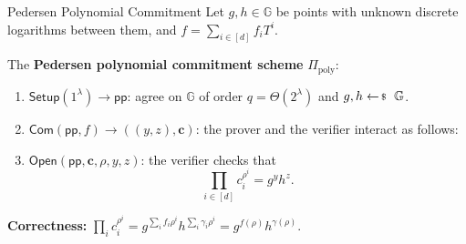 \documentclass{zkdl-presentation-template}
\begin{document}
    \begin{frame}{Pedersen Polynomial Commitment}
        \footnotesize
        Let $g, h \in \mathbb{G}$ be points with unknown discrete logarithms between them, and $f = \sum_{i \in [d]} f_i T^i$.

        \begin{definition}
            The \textbf{Pedersen polynomial commitment scheme} $\Pi_{\text{poly}}$:
            \begin{enumerate}
                \item $\mathsf{Setup}(1^{\lambda}) \to \mathsf{pp}$: agree on $\mathbb{G}$ of order $q = \Theta(2^{\lambda})$ and $g, h \leftarrowS \mathbb{G}$.\pause
                \item $\mathsf{Com}(\mathsf{pp}, f) \to ((y, z), \mathbf{c})$: the prover and the verifier interact as follows:
                \pause
                \item $\mathsf{Open}(\mathsf{pp}, \mathbf{c}, \rho, y, z)$: the verifier checks that
                \begin{equation*}
                    \prod_{i \in [d]} c_i^{\rho^i} = g^y h^z.
                \end{equation*}
            \end{enumerate}
        \end{definition}
        \pause

        \textbf{Correctness:} $\prod_{i} c_i^{\rho^i} = g^{\sum_i f_i \rho^i} h^{\sum_i \gamma_i \rho^i} = g^{f(\rho)} h^{\gamma(\rho)}$.
    \end{frame}
\end{document}

